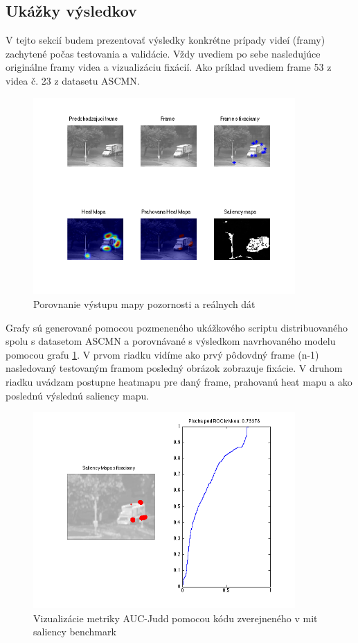 \subsection{Ukážky výsledkov}
V tejto sekcií budem prezentovať výsledky konkrétne prípady videí (framy) zachytené počas testovania a validácie.
Vždy uvediem po sebe nasledujúce originálne framy videa a vizualizáciu fixácií. Ako príklad uvediem frame 53 z videa č. 23 z datasetu ASCMN\cite{accv}.
\begin{figure}[H]
  \centering
  \includegraphics[width=10cm]{pics/ACCV-23-54-compare.png}
  \caption{Porovnanie výstupu mapy pozornosti a reálnych dát}
  \label{fig:ASCMN-53-23}
  \vspace{10mm}
\end{figure}
Grafy sú generované pomocou pozmeneného ukážkového scriptu distribuovaného spolu s datasetom ASCMN\cite{accv} a porovnávané s výsledkom navrhovaného modelu pomocou grafu \ref{fig:ASCMN-53-23}.
V prvom riadku vidíme ako prvý pôdovdný frame (n-1) nasledovaný testovaným framom posledný obrázok zobrazuje fixácie.
V druhom riadku uvádzam postupne heatmapu pre daný frame, prahovanú heat mapu a ako poslednú výslednú saliency mapu.

\begin{figure}[H]
  \centering
  \includegraphics[width=10cm]{pics/ACCV-23-54-AUC_Judd.png}
  \caption{Vizualizácie metriky AUC-Judd pomocou kódu zverejneného v mit saliency benchmark\cite{mit-saliency-benchmark}}
  \label{fig:ASCMN-53-23-AUC}
  \vspace{10mm}
\end{figure}

